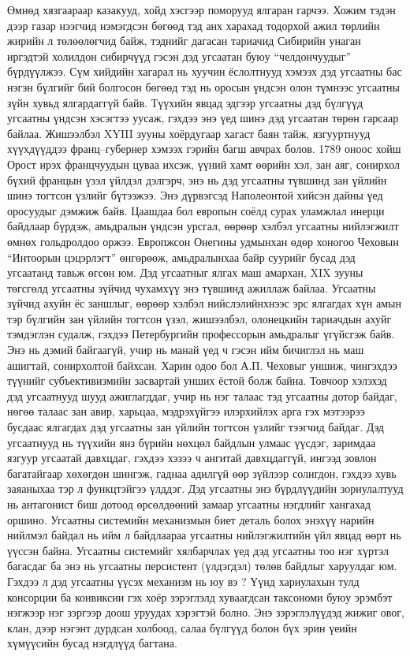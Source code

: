 Өмнөд хязгаараар казакууд, хойд хэсгээр поморууд ялгаран гарчээ. Хожим тэдэн дээр газар нээгчид нэмэгдсэн бөгөөд тэд анх харахад тодорхой ажил төрлийн жирийн л төлөөлөгчид байж, тэднийг дагасан тариачид Сибирийн унаган иргэдтэй холилдон сибирчүүд гэсэн дэд угсаатан буюу “челдончуудыг” бүрдүүлжээ. Сүм хийдийн хагарал нь хуучин ёслолтнууд хэмээх дэд угсаатны бас нэгэн бүлгийг бий болгосон бөгөөд тэд нь оросын үндсэн олон түмнээс угсаатны зүйн хувьд ялгардаггүй байв. Түүхийн явцад эдгээр угсаатны дэд бүлгүүд угсаатны үндсэн хэсэгтээ уусаж, гэхдээ энэ үед шинэ дэд угсаатан төрөн гарсаар байлаа.
Жишээлбэл XYIII зууны хоёрдугаар хагаст баян тайж, язгууртнууд хүүхдүүддээ франц–губернер хэмээх гэрийн багш авчрах болов. 1789 оноос хойш Орост ирэх францчуудын цуваа ихсэж, үүний хамт өөрийн хэл, зан аяг, сонирхол бүхий францын үзэл үйлдэл дэлгэрч, энэ нь дэд угсаатны түвшинд зан үйлийн шинэ тогтсон үзлийг бүтээжээ. Энэ дүрвэгсэд Наполеонтой хийсэн дайны үед оросуудыг дэмжиж байв. Цаашдаа бол европын соёлд сурах уламжлал инерци байдлаар бүрдэж, амьдралын үндсэн урсгал, өөрөөр хэлбэл угсаатны нийлэгжилт өмнөх гольдролдоо оржээ. Европжсон Онегины удмынхан өдөр хоногоо Чеховын “Интоорын цэцэрлэгт” өнгөрөөж, амьдралынхаа байр суурийг бусад дэд угсаатанд тавьж өгсөн юм.
Дэд угсаатныг ялгах маш амархан, XIX зууны төгсгөлд угсаатны зүйчид чухамхүү энэ түвшинд ажиллаж байлаа. Угсаатны зүйчид ахуйн ёс заншлыг, өөрөөр хэлбэл нийслэлийнхнээс эрс ялгагдах хүн амын тэр бүлгийн зан үйлийн тогтсон үзэл, жишээлбэл, олонецкийн тариачдын ахуйг тэмдэглэн судалж, гэхдээ Петербургийн профессорын амьдралыг үгүйсгэж байв. Энэ нь дэмий байгаагүй, учир нь манай үед ч гэсэн ийм бичиглэл нь маш ашигтай, сонирхолтой байхсан. Харин одоо бол А.П. Чеховыг уншиж, чингэхдээ түүнийг субъективизмийн засвартай унших ёстой болж байна.
Товчоор хэлэхэд дэд угсаатнууд шууд ажиглагддаг, учир нь нэг талаас тэд угсаатны дотор байдаг, нөгөө талаас зан авир, харьцаа, мэдрэхүйгээ илэрхийлэх арга гэх мэтээрээ бусдаас ялгагдах дэд угсаатны зан үйлийн тогтсон үзлийг тээгчид байдаг. Дэд угсаатнууд нь түүхийн янз бүрийн нөхцөл байдлын улмаас үүсдэг, заримдаа язгуур угсаатай давхцдаг, гэхдээ хэзээ ч ангитай давхцдаггүй, ингээд зовлон багатайгаар хөхөгдөн шингэж, гаднаа адилгүй өөр зүйлээр солигдон, гэхдээ хувь заяаныхаа тэр л функцтэйгээ үлддэг. Дэд угсаатны энэ бүрдлүүдийн зориулалтууд нь антагонист биш дотоод өрсөлдөөний замаар угсаатны нэгдлийг хангахад оршино. Угсаатны системийн механизмын биет деталь болох энэхүү нарийн нийлмэл байдал нь ийм л байдлаараа угсаатны нийлэгжилтийн үйл явцад өөрт нь үүссэн байна. Угсаатны системийг хялбарчлах үед дэд угсаатны тоо нэг хүртэл багасдаг ба энэ нь угсаатны персистент (үлдэгдэл) төлөв байдлыг харуулдаг юм. Гэхдээ л дэд угсаатны үүсэх механизм нь юу вэ ? Үүнд хариулахын тулд консорции ба конвиксии гэх хоёр зэрэглэлд хуваагдсан таксономи буюу эрэмбэт нэгжээр нэг зэргээр доош уруудах хэрэгтэй болно. Энэ зэрэглэлүүдэд жижиг овог, клан, дээр нэгэнт дурдсан холбоод, салаа бүлгүүд болон бүх эрин үеийн хүмүүсийн бусад нэгдлүүд багтана.
